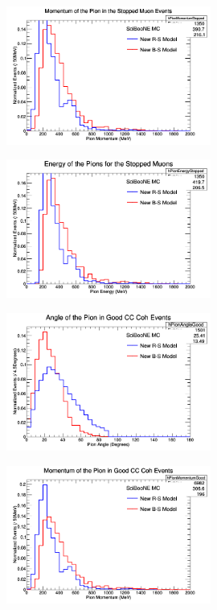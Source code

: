 \documentclass[11pt]{article}
\begin{document}
\begin{figure}[H]
\centering
\includegraphics[width=0.6\textwidth]{ANMPionPlottingImages/5-ANMPionPlotting.png}
\caption{}
\end{figure}

\begin{figure}[H]
\centering
\includegraphics[width=0.6\textwidth]{ANMPionPlottingImages/6-ANMPionPlotting.png}
\caption{}
\end{figure}

\begin{figure}[H]
\centering
\includegraphics[width=0.6\textwidth]{ANMPionPlottingImages/7-ANMPionPlotting.png}
\caption{}
\end{figure}

\begin{figure}[H]
\centering
\includegraphics[width=0.6\textwidth]{ANMPionPlottingImages/8-ANMPionPlotting.png}
\caption{}
\end{figure}
\end{document}
